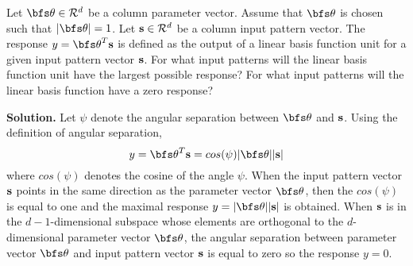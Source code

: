 \begin{example}
Let ${\bfs \theta} \in {\cal R}^d$ be a column parameter vector.
Assume that ${\bfs \theta}$ is chosen such that $|{\bfs \theta}| = 1$.
Let ${\bf s} \in {\cal R}^d$ be a column input pattern vector.
The response $y = {\bfs \theta}^T {\bf s}$ is defined as the output
of a linear basis function unit for a given input pattern vector ${\bf s}$.
For what input patterns will the linear basis function unit have the largest possible
response? For what input patterns will the linear basis function have a zero
response?

{\bf Solution.}
Let $\psi$ denote the angular separation between ${\bfs \theta}$ and ${\bf s}$.
Using the definition of angular separation, 
\begin{equation}
\label{linearunitangle}
y = {\bfs \theta}^T {\bf s} = cos (\psi) |{\bfs \theta}| |{\bf s}|
\end{equation}
where $cos (\psi)$ denotes the cosine of the angle $\psi$.
When the input pattern vector ${\bf s}$ points in the same direction as the
parameter vector ${\bfs \theta}$, then the $cos(\psi)$ is equal to one
and the maximal response $y = |{\bfs \theta}| |{\bf s}|$ is obtained.
When ${\bf s}$ is in the $d-1$-dimensional subspace whose elements
are orthogonal to the $d$-dimensional parameter vector
${\bfs \theta}$, the angular separation between parameter vector ${\bfs \theta}$
and input pattern vector ${\bf s}$ is equal to zero so the response $y = 0$. 
\end{example}


